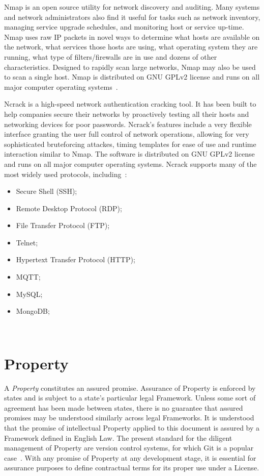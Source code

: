 \documentclass[11pt, oneside]{book}   	%
\begin{document}
Nmap is an open source utility for network discovery and auditing.
Many systems and network administrators also find it useful for tasks such as network inventory, managing service upgrade schedules, and monitoring host or service up-time.
Nmap uses raw IP packets in novel ways to determine what hosts are available on the network, what services those hosts are using, what operating system they are running, what type of filters/firewalls are in use and dozens of other characteristics.
Designed to rapidly scan large networks, Nmap may also be used to scan a single host.
Nmap is distributed on GNU GPLv2 license and runs on all major computer operating systems~\cite{nmap}.\

Ncrack is a high-speed network authentication cracking tool.
It has been built to help companies secure their networks by proactively testing all their hosts and networking devices for poor passwords.
Ncrack's features include a very flexible interface granting the user full control of network operations, allowing for very sophisticated bruteforcing attackes, timing templates for ease of use and runtime interaction similar to Nmap.
The software is distributed on GNU GPLv2 license and runs on all major computer operating systems.
Ncrack supports many of the most widely used protocols, including~\cite{ncrack}:
\begin{itemize}
	\item Secure Shell (SSH);
	\item Remote Desktop Protocol (RDP);
	\item File Transfer Protocol (FTP);
	\item Telnet;
	\item Hypertext Transfer Protocol (HTTP);
	\item MQTT;
	\item MySQL;
	\item MongoDB;
\end{itemize}\

\section{Property}
A \emph{Property} constitutes an assured promise.
Assurance of Property is enforced by states and is subject to a state's particular legal Framework.
Unless some sort of agreement has been made between states, there is no guarantee that assured promises may be understood similarly across legal Frameworks.
It is understood that the promise of intellectual Property applied to this document is assured by a Framework defined in English Law.
The present standard for the diligent management of Property are version control systems, for which Git is a popular case~\cite{git}.
With any promise of Property at any development stage, it is essential for assurance purposes to define contractual terms for its proper use under a License.
\end{document}
